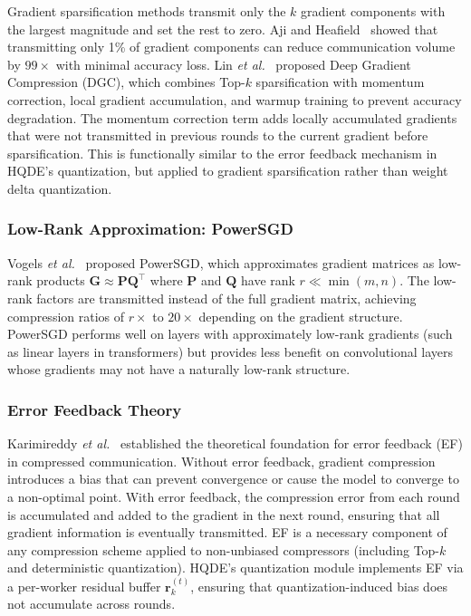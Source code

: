 \documentclass[journal,twoside]{IEEEtran}
\newcommand{\hqde}{\mbox{HQDE}\xspace}
\newcommand{\etal}{\textit{et al.}\xspace}
\begin{document}
Gradient sparsification methods transmit only the $k$ gradient
components with the largest magnitude and set the rest to zero.
Aji and Heafield~\cite{aji2017} showed that transmitting only 1\% of
gradient components can reduce communication volume by $99\times$ with
minimal accuracy loss. Lin \etal~\cite{lin2018dgc} proposed Deep
Gradient Compression (DGC), which combines Top-$k$ sparsification with
momentum correction, local gradient accumulation, and warmup training
to prevent accuracy degradation. The momentum correction term adds
locally accumulated gradients that were not transmitted in previous
rounds to the current gradient before sparsification. This is
functionally similar to the error feedback mechanism in \hqde{}'s
quantization, but applied to gradient sparsification rather than
weight delta quantization.

\subsubsection{Low-Rank Approximation: PowerSGD}

Vogels \etal~\cite{vogels2019powersgd} proposed PowerSGD, which
approximates gradient matrices as low-rank products $\mathbf{G}
\approx \mathbf{P}\mathbf{Q}^{\top}$ where $\mathbf{P}$ and
$\mathbf{Q}$ have rank $r \ll \min(m,n)$. The low-rank factors are
transmitted instead of the full gradient matrix, achieving compression
ratios of $r\times$ to $20\times$ depending on the gradient structure.
PowerSGD performs well on layers with approximately low-rank gradients
(such as linear layers in transformers) but provides less benefit on
convolutional layers whose gradients may not have a naturally low-rank
structure.

\subsubsection{Error Feedback Theory}

Karimireddy \etal~\cite{karimireddy2019ef} established the theoretical
foundation for error feedback (EF) in compressed communication.
Without error feedback, gradient compression introduces a bias that
can prevent convergence or cause the model to converge to a
non-optimal point. With error feedback, the compression error from
each round is accumulated and added to the gradient in the next round,
ensuring that all gradient information is eventually transmitted. EF
is a necessary component of any compression scheme applied to
non-unbiased compressors (including Top-$k$ and deterministic
quantization). \hqde{}'s quantization module implements EF via a
per-worker residual buffer $\mathbf{r}_k^{(t)}$, ensuring that
quantization-induced bias does not accumulate across rounds.
\end{document}
